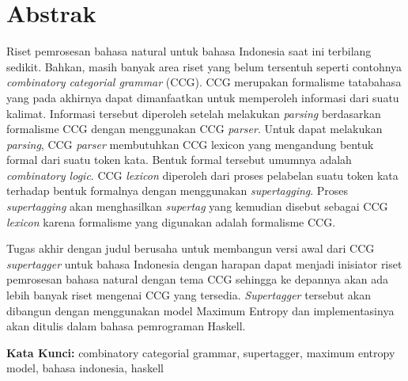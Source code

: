 \chapter*{Abstrak}

Riset pemrosesan bahasa natural untuk bahasa Indonesia saat ini terbilang sedikit.
Bahkan, masih banyak area riset yang belum tersentuh seperti contohnya
\textit{combinatory categorial grammar} (CCG).
CCG merupakan formalisme tatabahasa yang pada akhirnya dapat dimanfaatkan untuk memperoleh informasi
dari suatu kalimat.
Informasi tersebut diperoleh setelah melakukan \textit{parsing} berdasarkan formalisme CCG dengan
menggunakan CCG \textit{parser}.
Untuk dapat melakukan \textit{parsing}, CCG \textit{parser} membutuhkan CCG lexicon yang mengandung
bentuk formal dari suatu token kata.
Bentuk formal tersebut umumnya adalah \textit{combinatory logic}.
CCG \textit{lexicon} diperoleh dari proses pelabelan suatu token kata terhadap bentuk formalnya dengan
menggunakan \textit{supertagging}.
Proses \textit{supertagging} akan menghasilkan \textit{supertag} yang kemudian disebut sebagai CCG
\textit{lexicon} karena formalisme yang digunakan adalah formalisme CCG.

Tugas akhir dengan judul \textbf{\Title} berusaha untuk membangun versi awal dari CCG
\textit{supertagger} untuk bahasa Indonesia dengan harapan dapat menjadi inisiator riset
pemrosesan bahasa natural dengan tema CCG sehingga ke depannya akan ada lebih banyak riset
mengenai CCG yang tersedia.
\textit{Supertagger} tersebut akan dibangun dengan menggunakan model Maximum Entropy dan implementasinya
akan ditulis dalam bahasa pemrograman Haskell.


\vspace{0.5 cm}
\begin{flushleft}
{\textbf{Kata Kunci:}
  combinatory categorial grammar, supertagger, maximum entropy model, bahasa indonesia, haskell
}
\end{flushleft}

